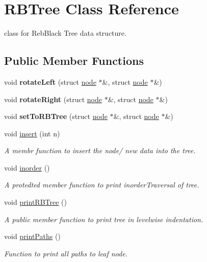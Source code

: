 \hypertarget{classRBTree}{}\section{R\+B\+Tree Class Reference}
\label{classRBTree}


class for Reb\+Black Tree data structure.  


\subsection*{Public Member Functions}
\begin{DoxyCompactItemize}
\item 
\mbox{\label{classRBTree_a48388a82f66c0d8e39f1161cd066ecfc}} 
void {\bfseries rotate\+Left} (struct \hyperlink{structnode}{node} $\ast$\&, struct \hyperlink{structnode}{node} $\ast$\&)
\item 
\mbox{\label{classRBTree_a05766c1d13ac874080adba1846d7f2b5}} 
void {\bfseries rotate\+Right} (struct \hyperlink{structnode}{node} $\ast$\&, struct \hyperlink{structnode}{node} $\ast$\&)
\item 
\mbox{\label{classRBTree_a309da2938362e33c098e7698de9194c4}} 
void {\bfseries set\+To\+R\+B\+Tree} (struct \hyperlink{structnode}{node} $\ast$\&, struct \hyperlink{structnode}{node} $\ast$\&)
\item 
void \hyperlink{classRBTree_a4b8c33ea38498194b3f31876283058ec}{insert} (int n)
\begin{DoxyCompactList}\small\item\em A membr function to insert the node/ new data into the tree. \end{DoxyCompactList}\item 
void \hyperlink{classRBTree_aff8e5c4479e6708da9a6cbfc276836a3}{inorder} ()
\begin{DoxyCompactList}\small\item\em A protedted member function to print inorder\+Traversal of tree. \end{DoxyCompactList}\item 
\mbox{\label{classRBTree_a0399338ba77d466049c6e663dd9163ee}} 
void \hyperlink{classRBTree_a0399338ba77d466049c6e663dd9163ee}{print\+R\+B\+Tree} ()
\begin{DoxyCompactList}\small\item\em A public member function to print tree in levelwise indentation. \end{DoxyCompactList}\item 
\mbox{\label{classRBTree_aa2dcf0d6aa43fb2bf5bc82efd55ebb66}} 
void \hyperlink{classRBTree_aa2dcf0d6aa43fb2bf5bc82efd55ebb66}{print\+Paths} ()
\begin{DoxyCompactList}\small\item\em Function to print all paths to leaf node. \end{DoxyCompactList}\end{DoxyCompactItemize}


